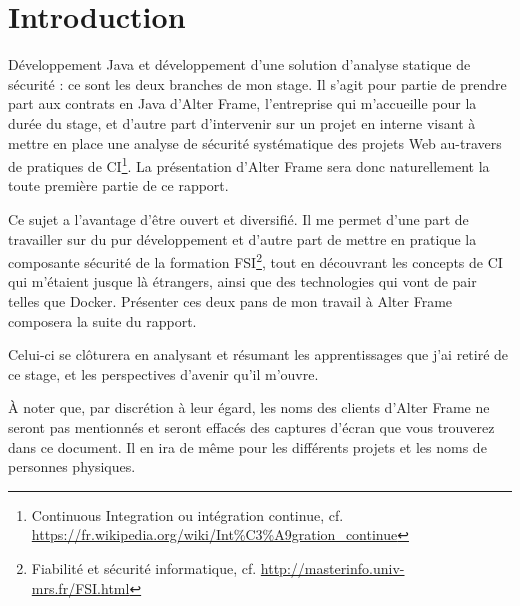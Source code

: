 \section*{Introduction}
Développement Java et développement d'une solution d'analyse statique de sécurité : ce sont les deux branches de mon stage. Il s'agit pour partie de prendre part aux contrats en Java d'Alter Frame, l'entreprise qui m'accueille pour la durée du stage, et d'autre part d'intervenir sur un projet en interne visant à mettre en place une analyse de sécurité systématique des projets Web au-travers de pratiques de CI\footnote{Continuous Integration ou intégration continue, cf. \url{https://fr.wikipedia.org/wiki/Int\%C3\%A9gration_continue}}. La présentation d'Alter Frame sera donc naturellement la toute première partie de ce rapport.

Ce sujet a l'avantage d'être ouvert et diversifié. Il me permet d'une part de travailler sur du pur développement et d'autre part de mettre en pratique la composante sécurité de la formation FSI\footnote{Fiabilité et sécurité informatique, cf. \url{http://masterinfo.univ-mrs.fr/FSI.html}}, tout en découvrant les concepts de CI qui m'étaient jusque là étrangers, ainsi que des technologies qui vont de pair telles que Docker. Présenter ces deux pans de mon travail à Alter Frame composera la suite du rapport.

Celui-ci se clôturera en analysant et résumant les apprentissages que j'ai retiré de ce stage, et les perspectives d'avenir qu'il m'ouvre.

À noter que, par discrétion à leur égard, les noms des clients d'Alter Frame ne seront pas mentionnés et seront effacés des captures d'écran que vous trouverez dans ce document. Il en ira de même pour les différents projets et les noms de personnes physiques.